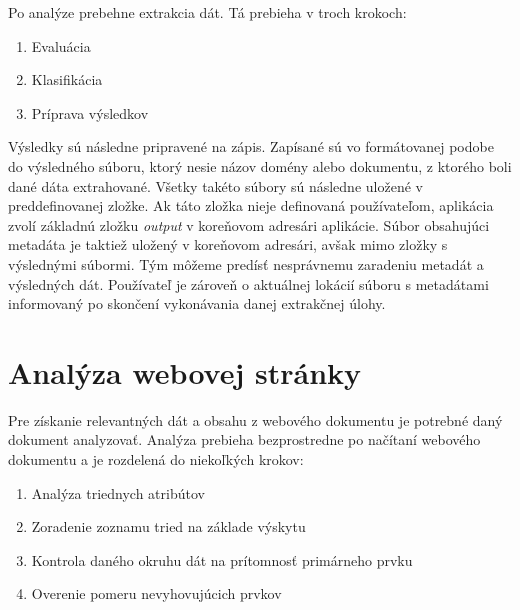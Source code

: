  Po analýze prebehne extrakcia dát. Tá prebieha v troch krokoch:
 
 \begin{enumerate}
     \item Evaluácia
     \item Klasifikácia
     \item Príprava výsledkov
 \end{enumerate}
 
 \bigskip
 
 Výsledky sú následne pripravené na zápis. Zapísané sú vo formátovanej podobe do výsledného súboru, ktorý nesie názov domény alebo dokumentu, z ktorého boli dané dáta extrahované. Všetky takéto súbory sú následne uložené v preddefinovanej zložke. Ak táto zložka nieje definovaná používateľom, aplikácia zvolí základnú zložku \textit{output} v koreňovom adresári aplikácie. Súbor obsahujúci metadáta je taktiež uložený v koreňovom adresári, avšak mimo zložky s výslednými súbormi. Tým môžeme predísť nesprávnemu zaradeniu metadát a výsledných dát. Používateľ je zároveň o aktuálnej lokácií súboru s metadátami informovaný po skončení vykonávania danej extrakčnej úlohy.
 
 \newpage
 \section{Analýza webovej stránky}
 
 Pre získanie relevantných dát a obsahu z webového dokumentu je potrebné daný dokument analyzovať. Analýza prebieha bezprostredne po načítaní webového dokumentu a je rozdelená do niekoľkých krokov:
 
 \begin{enumerate}
     \item Analýza triednych atribútov
     \item Zoradenie zoznamu tried na základe výskytu
     \item Kontrola daného okruhu dát na prítomnosť primárneho prvku
     \item Overenie pomeru nevyhovujúcich prvkov
 \end{enumerate}
 
 \bigskip
 
